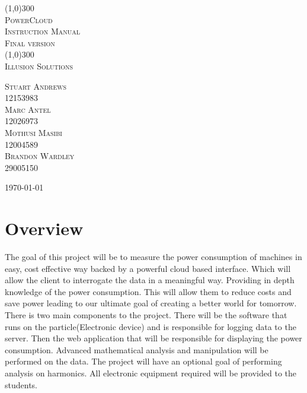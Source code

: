 \documentclass[a4paper,10pt]{article}
\author{Illusion Solutions}
\begin{document}
	
	\begin{titlepage}
		\begin{center}
			\line(1,0){300} \\
			[0.1cm]
			\textsc{\Huge
				PowerCloud\\
				Instruction Manual
			} \\
			\textsc{\large Final version}\\
			[0.1cm]
			\line(1,0){300} \\
			[2.0cm]
			\textsc{\Large
				Illusion Solutions
			} \\
			[3.5cm]
			
		\end{center}
		\begin{flushright}
			\textsc{\Large
				Stuart Andrews\\ 
				12153983\\
				Marc Antel\\
				12026973\\
				Mothusi Masibi\\
				12004589\\
				Brandon Wardley\\
				29005150\\
				[4.0cm]
			}
		\end{flushright}
		\begin{center}
			\today
		\end{center}
	\end{titlepage}
	
	\newpage
	\restoregeometry
	\tableofcontents
	\thispagestyle{empty}
	\newpage
	
	\section{Overview}
	The goal of this project will be to measure the power consumption of machines
	in easy, cost effective way backed by a powerful cloud based interface. Which
	will allow the client to interrogate the data in a meaningful way. Providing in
	depth knowledge of the power consumption. This will allow them to reduce
	costs and save power leading to our ultimate goal of creating a better world
	for tomorrow. There is two main components to the project. There will be
	the software that runs on the particle(Electronic device) and is responsible for
	logging data to the server. Then the web application that will be responsible
	for displaying the power consumption. Advanced mathematical analysis and
	manipulation will be performed on the data. The project will have an optional
	goal of performing analysis on harmonics. All electronic equipment required
	will be provided to the students.
\end{document}
